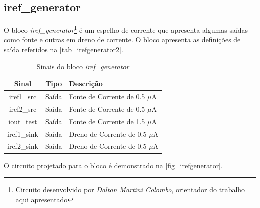 \renewcommand{\NomeBloco}{\textit{iref\_generator}}
\renewcommand{\NomeBlocoNoUnderline}{irefgenerator}
\renewcommand{\NomePTab}{tab_\NomeBlocoNoUnderline}
\renewcommand{\NomeSTab}{tab_\NomeBlocoNoUnderline2}
\renewcommand{\NomePFig}{fig_\NomeBlocoNoUnderline}
\renewcommand{\NomeSFig}{fig_\NomeBlocoNoUnderline2}
\renewcommand{\NomeTTab}{tab_\NomeBlocoNoUnderline3}
\renewcommand{\NomeQTab}{tab_\NomeBlocoNoUnderline4}

\subsection{iref\_generator}

O bloco \NomeBloco{}\footnote{Circuito desenvolvido por \textit{Dalton Martini Colombo}, orientador do trabalho aqui apresentado} \'e um espelho de corrente que apresenta algumas sa\'idas como fonte e outras em dreno de corrente. O bloco apresenta as definições de sa\'ida referidos na \autoref{\NomeSTab}.

\begin{table}[!h]
\caption{Sinais do bloco \NomeBloco}
\label{\NomeSTab}
\centering
\begin{tabular}{ccl}

    \toprule
    Sinal & Tipo    & Descrição        \\
    \midrule \midrule
    iref1\_src   & Saída   & Fonte de Corrente de 0.5 $\mu$A \\
    \midrule
    iref2\_src   & Saída   & Fonte de Corrente de 0.5 $\mu$A \\
    \midrule
    iout\_test   & Saída   & Fonte de Corrente de 1.5 $\mu$A \\
    \midrule
    iref1\_sink   & Saída   & Dreno de Corrente de 0.5 $\mu$A \\
    \midrule
    iref2\_sink   & Saída   & Dreno de Corrente de 0.5 $\mu$A \\
    \bottomrule
\end{tabular}
\end{table}

O circuito projetado para o bloco \'e demonstrado na \autoref{\NomePFig}.


